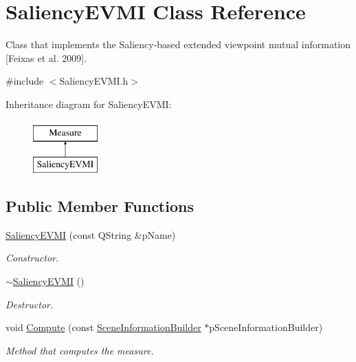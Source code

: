 \hypertarget{class_saliency_e_v_m_i}{\section{Saliency\+E\+V\+M\+I Class Reference}
\label{class_saliency_e_v_m_i}
}


Class that implements the Saliency-\/based extended viewpoint mutual information \mbox{[}Feixas et al. 2009\mbox{]}.  




{\ttfamily \#include $<$Saliency\+E\+V\+M\+I.\+h$>$}

Inheritance diagram for Saliency\+E\+V\+M\+I\+:\begin{figure}[H]
\begin{center}
\leavevmode
\includegraphics[height=2.000000cm]{class_saliency_e_v_m_i}
\end{center}
\end{figure}
\subsection*{Public Member Functions}
\begin{DoxyCompactItemize}
\item 
\hyperlink{class_saliency_e_v_m_i_ab47f19aba9732cbc08ae7abf851dfce6}{Saliency\+E\+V\+M\+I} (const Q\+String \&p\+Name)
\begin{DoxyCompactList}\small\item\em Constructor. \end{DoxyCompactList}\item 
\hyperlink{class_saliency_e_v_m_i_ab8adfe2e935489fe5f96a66084a09c15}{$\sim$\+Saliency\+E\+V\+M\+I} ()
\begin{DoxyCompactList}\small\item\em Destructor. \end{DoxyCompactList}\item 
void \hyperlink{class_saliency_e_v_m_i_a4263df7e95066a5c1b9fb1c6532aca97}{Compute} (const \hyperlink{class_scene_information_builder}{Scene\+Information\+Builder} $\ast$p\+Scene\+Information\+Builder)
\begin{DoxyCompactList}\small\item\em Method that computes the measure. \end{DoxyCompactList}\end{DoxyCompactItemize}
